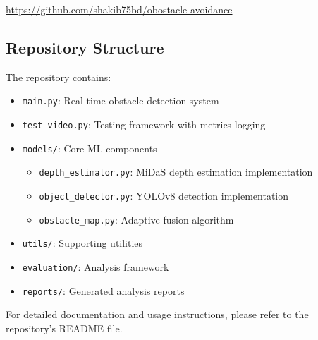 \documentclass[12pt,oneside]{book}
\begin{document}
\begin{center}
\url{https://github.com/shakib75bd/obostacle-avoidance}
\end{center}

\subsection*{Repository Structure}

The repository contains:
\begin{itemize}
\item \texttt{main.py}: Real-time obstacle detection system
\item \texttt{test\_video.py}: Testing framework with metrics logging
\item \texttt{models/}: Core ML components
    \begin{itemize}
    \item \texttt{depth\_estimator.py}: MiDaS depth estimation implementation
    \item \texttt{object\_detector.py}: YOLOv8 detection implementation
    \item \texttt{obstacle\_map.py}: Adaptive fusion algorithm
    \end{itemize}
\item \texttt{utils/}: Supporting utilities
\item \texttt{evaluation/}: Analysis framework
\item \texttt{reports/}: Generated analysis reports
\end{itemize}

For detailed documentation and usage instructions, please refer to the repository's README file.
\end{document}
